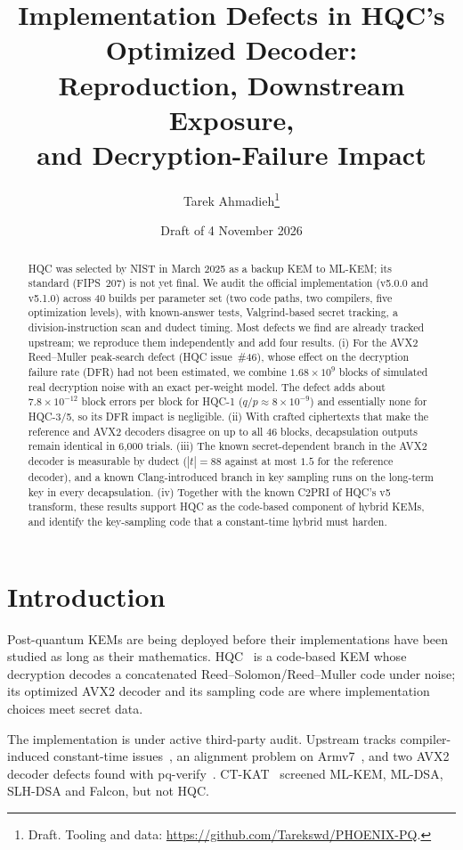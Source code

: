 \documentclass[11pt,a4paper]{article}
\title{Implementation Defects in HQC's Optimized Decoder:\\ Reproduction, Downstream Exposure,\\ and Decryption-Failure Impact}
\author{Tarek Ahmadieh\thanks{Draft. Tooling and data: \protect\url{https://github.com/Tarekswd/PHOENIX-PQ}.}}
\date{Draft of 4 November 2026}
\begin{document}
\maketitle

\begin{abstract}
HQC was selected by NIST in March 2025 as a backup KEM to ML-KEM; its standard (FIPS~207) is not yet final. We audit the official implementation (v5.0.0 and v5.1.0) across 40 builds per parameter set (two code paths, two compilers, five optimization levels), with known-answer tests, Valgrind-based secret tracking, a division-instruction scan and dudect timing.
Most defects we find are already tracked upstream; we reproduce them independently and add four results.
(i) For the AVX2 Reed--Muller peak-search defect (HQC issue~\#46), whose effect on the decryption failure rate (DFR) had not been estimated, we combine $1.68\times 10^{9}$ blocks of simulated real decryption noise with an exact per-weight model. The defect adds about $7.8\times10^{-12}$ block errors per block for HQC-1 ($q/p\approx 8\times 10^{-9}$) and essentially none for HQC-3/5, so its DFR impact is negligible.
(ii) With crafted ciphertexts that make the reference and AVX2 decoders disagree on up to all 46 blocks, decapsulation outputs remain identical in 6{,}000 trials.
(iii) The known secret-dependent branch in the AVX2 decoder is measurable by dudect ($|t|=88$ against at most $1.5$ for the reference decoder), and a known Clang-introduced branch in key sampling runs on the long-term key in every decapsulation.
(iv) Together with the known C2PRI of HQC's v5 transform, these results support HQC as the code-based component of hybrid KEMs, and identify the key-sampling code that a constant-time hybrid must harden.
\end{abstract}

\section{Introduction}
Post-quantum KEMs are being deployed before their implementations have been studied as long as their mathematics. HQC~\cite{NISTHQC25} is a code-based KEM whose decryption decodes a concatenated Reed--Solomon/Reed--Muller code under noise; its optimized AVX2 decoder and its sampling code are where implementation choices meet secret data.

The implementation is under active third-party audit. Upstream tracks compiler-induced constant-time issues~\cite{HQC11}, an alignment problem on Armv7~\cite{HQC31}, and two AVX2 decoder defects found with pq-verify~\cite{HQC39,HQC46,pqverify}. CT-KAT~\cite{CTKAT26} screened ML-KEM, ML-DSA, SLH-DSA and Falcon, but not HQC.
\end{document}
